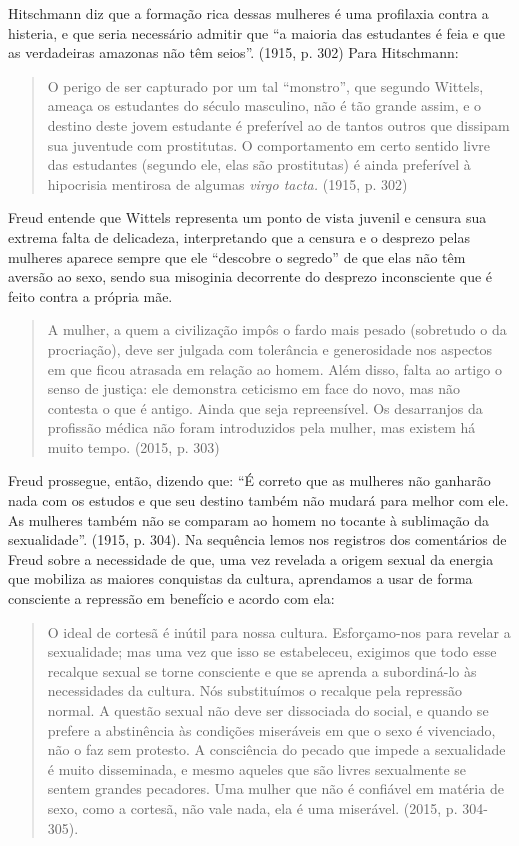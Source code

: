 Hitschmann diz que a formação rica dessas mulheres é uma profilaxia
contra a histeria, e que seria necessário admitir que ``a maioria das
estudantes é feia e que as verdadeiras amazonas não têm seios''. (1915,
p. 302) Para Hitschmann:

\begin{quote}
O perigo de ser capturado por um tal ``monstro'', que segundo Wittels,
ameaça os estudantes do século masculino, não é tão grande assim, e o
destino deste jovem estudante é preferível ao de tantos outros que
dissipam sua juventude com prostitutas. O comportamento em certo sentido
livre das estudantes (segundo ele, elas são prostitutas) é ainda
preferível à hipocrisia mentirosa de algumas \emph{virgo tacta.} (1915,
p. 302)
\end{quote}

Freud entende que Wittels representa um ponto de vista juvenil e censura
sua extrema falta de delicadeza, interpretando que a censura e o
desprezo pelas mulheres aparece sempre que ele ``descobre o segredo'' de
que elas não têm aversão ao sexo, sendo sua misoginia decorrente do
desprezo inconsciente que é feito contra a própria mãe.

\begin{quote}
A mulher, a quem a civilização impôs o fardo mais pesado (sobretudo o da
procriação), deve ser julgada com tolerância e generosidade nos aspectos
em que ficou atrasada em relação ao homem. Além disso, falta ao artigo o
senso de justiça: ele demonstra ceticismo em face do novo, mas não
contesta o que é antigo. Ainda que seja repreensível. Os desarranjos da
profissão médica não foram introduzidos pela mulher, mas existem há
muito tempo. (2015, p. 303)
\end{quote}

Freud prossegue, então, dizendo que: ``É correto que as mulheres não
ganharão nada com os estudos e que seu destino também não mudará para
melhor com ele. As mulheres também não se comparam ao homem no tocante à
sublimação da sexualidade''. (1915, p. 304). Na sequência lemos nos
registros dos comentários de Freud sobre a necessidade de que, uma vez
revelada a origem sexual da energia que mobiliza as maiores conquistas
da cultura, aprendamos a usar de forma consciente a repressão em
benefício e acordo com ela:

\begin{quote}
O ideal de cortesã é inútil para nossa cultura. Esforçamo-nos para
revelar a sexualidade; mas uma vez que isso se estabeleceu, exigimos que
todo esse recalque sexual se torne consciente e que se aprenda a
subordiná-lo às necessidades da cultura. Nós substituímos o recalque
pela repressão normal. A questão sexual não deve ser dissociada do
social, e quando se prefere a abstinência às condições miseráveis em que
o sexo é vivenciado, não o faz sem protesto. A consciência do pecado que
impede a sexualidade é muito disseminada, e mesmo aqueles que são livres
sexualmente se sentem grandes pecadores. Uma mulher que não é confiável
em matéria de sexo, como a cortesã, não vale nada, ela é uma miserável.
(2015, p. 304-305).
\end{quote}

